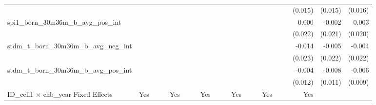 \begin{tabular}{lrrrrrrrrrrrrrrrrrr}
                                            &              &              &              &              &              &              &              &              &               &              &              &               &              &              &               &      (0.015) &      (0.015) &       (0.016) \\ 
spi1\_born\_30m36m\_b\_avg\_pos\_int        &              &              &              &              &              &              &              &              &               &              &              &               &              &              &               &        0.000 &       -0.002 &         0.003 \\ 
                                            &              &              &              &              &              &              &              &              &               &              &              &               &              &              &               &      (0.022) &      (0.021) &       (0.020) \\ 
stdm\_t\_born\_30m36m\_b\_avg\_neg\_int     &              &              &              &              &              &              &              &              &               &              &              &               &              &              &               &       -0.014 &       -0.005 &        -0.004 \\ 
                                            &              &              &              &              &              &              &              &              &               &              &              &               &              &              &               &      (0.023) &      (0.022) &       (0.022) \\ 
stdm\_t\_born\_30m36m\_b\_avg\_pos\_int     &              &              &              &              &              &              &              &              &               &              &              &               &              &              &               &       -0.004 &       -0.008 &        -0.006 \\ 
                                            &              &              &              &              &              &              &              &              &               &              &              &               &              &              &               &      (0.012) &      (0.011) &       (0.009) \\ 
\midrule
ID\_cell1 $\times$ chb\_year Fixed Effects  &          Yes &              &              &          Yes &              &              &          Yes &              &               &          Yes &              &               &          Yes &              &               &          Yes &              &               \\ 

\end{tabular}
